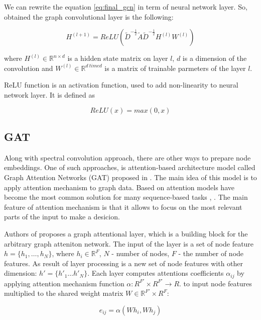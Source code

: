 We can rewrite the equation \ref{eq:final_gcn} in term of neural network layer. So, obtained the graph convolutional layer 
is the following:

\begin{equation}
    H^{(l+1)} = ReLU(\tilde{D}^{-\frac{1}{2}}\tilde{A}\tilde{D}^{-\frac{1}{2}}H^{(l)}W^{(l)})
    \label{eq:final_gcn_nn}
\end{equation}

where $H^{(l)} \in \mathbb{R}^{n \times d}$ is a hidden state matrix on layer $l$, $d$ is a dimension
of the convolution and $W^{(l)} \in \mathbb{R}^{d \ time d}$ is a matrix of trainable parmeters of the layer $l$.

ReLU function is an activation function, used to add non-linearity to neural network layer. It is defined as

\begin{equation}
    ReLU(x) = max(0,x)
    \label{eq:relu}
\end{equation}

\subsection{GAT}
Along with spectral convolution approach, there are other ways to prepare node embeddings. One of such approaches, is 
attention-based architecture model called Graph Attention Networks (GAT) proposed in \cite{GAT}.
The main idea of this model is to apply attention mechanism to graph data. Based on attention models have become 
the most common solution for many sequence-based tasks \cite{GATintro1}, \cite{GATintro2}.
The main feature of attention mechanism is that it allows to focus on the most relevant parts of the input 
to make a desicion.

Authors of \cite{GAT} proposes a graph attentional layer, which is a building block for the arbitrary graph atteniton network.
The input of the layer is a set of node feature $ h=\{ h_1,\dots , h_N \}$, where $h_i \in \mathbb{R}^F$, $N$ - number of nodes, $F$ - the number
of node features. As result of layer processing is a new set of node features with other dimension: $h' = \{ h'_1 \dots h'_N \}$.
Each layer computes attentions coefficients $\alpha_{ij}$ by applying attention mechanism function $\alpha : R^{F'} \times R^{F'} \rightarrow R$.
to input node features multiplied to the shared weight matrix $W \in \mathbb{R}^{F'} \times R^{F}$:

\begin{equation}
    e_{ij} = \alpha(Wh_i, Wh_j)
    \label{eq:att_coeff}
\end{equation}

